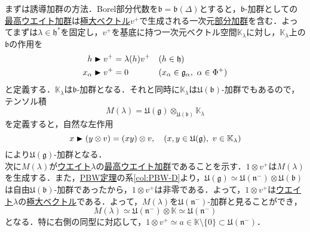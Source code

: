 \documentclass[rep_main]{subfiles}
\begin{document}
まずは誘導加群の方法．Borel部分代数を$\mathfrak{b} = \mathfrak{b}(\Delta)$とすると，$\mathfrak{b}$-加群としての\hyperref[def:highest-weight-module]{最高ウエイト加群}は\hyperref[def:maximal-vector-rep]{極大ベクトル}$v^+$で生成される一次元\hyperref[def:sub-g-module]{部分加群}を含む．よってまずは$\lambda \in \mathfrak{h}^*$を固定し，$v^+$を基底に持つ一次元ベクトル空間$\mathbb{K}_\lambda$に対し，$\mathbb{K}_\lambda$上の$\mathfrak{b}$の作用を
\begin{align}
	h \blacktriangleright v^+ &= \lambda(h) v^+  &&(h \in \mathfrak{h}) \\
	x_\alpha \blacktriangleright v^+ &= 0  &&(x_\alpha \in \mathfrak{g}_\alpha,\ \alpha \in \Phi^+)
\end{align}
と定義する．$\mathbb{K}_\lambda$は$\mathfrak{b}$-加群となる．それと同時に$\mathbb{K}_\lambda$は$\mathfrak{U}(\mathfrak{b})$-加群でもあるので，テンソル積
\begin{equation}
	M(\lambda) = \mathfrak{U}(\mathfrak{g}) \otimes_{\mathfrak{U}(\mathfrak{b})} \mathbb{K}_\lambda
\end{equation}
を定義すると，自然な左作用
\begin{equation}
	x \blacktriangleright (y \otimes v) = (xy) \otimes v,\quad  (x, y \in \mathfrak{U}(\mathfrak{g}),\ v \in \mathbb{K}_\lambda)
\end{equation}
により$\mathfrak{U}(\mathfrak{g})$-加群となる．\\
次に$M(\lambda)$が\hyperref[def:weight-rep]{ウエイト}$\lambda$の\hyperref[def:highest-weight-module]{最高ウエイト加群}であることを示す．$1 \otimes v^+$は$M(\lambda)$を生成する．また，\hyperref[thm:PBW]{PBW定理}の系\ref{col:PBW-D}より，$\mathfrak{U}(\mathfrak{g}) \simeq \mathfrak{U}(\mathfrak{n}^-)\otimes\mathfrak{U}(\mathfrak{b})$は自由$\mathfrak{U}(\mathfrak{b})$-加群であったから，$1 \otimes v^+$は非零である．よって，$1 \otimes v^+$は\hyperref[def:weight-rep]{ウエイト}$\lambda$の\hyperref[def:maximal-vector-rep]{極大ベクトル}である．よって，$M(\lambda)$を$\mathfrak{U}(\mathfrak{n}^-)$-加群と見ることができ，
\begin{equation}
	M(\lambda) \simeq \mathfrak{U}(\mathfrak{n}^-) \otimes \mathbb{K} \simeq  \mathfrak{U}(\mathfrak{n}^-)
\end{equation}
となる．特に右側の同型に対応して，$1 \otimes v^+ \simeq a \in \mathbb{K}\setminus\{0\} \subset \mathfrak{U}(\mathfrak{n}^-)$．
\end{document}
